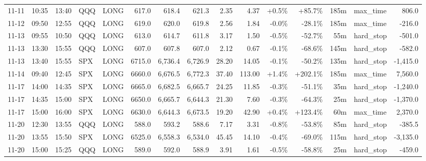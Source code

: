 \documentclass[11pt,a4paper,twoside]{article}
\begin{document}
\begin{landscape}
\begin{center}
\begin{longtable}{>{\color{txtmain}}l l l l l r r r r r r r r >{\color{txtmain}}l r}
11-11 & 10:35 & 13:40 & QQQ & LONG & 617.0 & 618.4 & 621.3 & 2.35 & 4.37 & \textcolor{wingreen}{+0.5\%} & \textcolor{wingreen}{+85.7\%} & 185m & max\_time & \textcolor{wingreen}{806.0} \\
11-12 & 09:50 & 12:55 & QQQ & LONG & 619.0 & 620.0 & 619.8 & 2.56 & 1.84 & \textcolor{lossred}{-0.0\%} & \textcolor{lossred}{-28.1\%} & 185m & max\_time & \textcolor{lossred}{-216.0} \\
11-13 & 09:55 & 10:50 & QQQ & LONG & 613.0 & 614.7 & 611.8 & 3.17 & 1.50 & \textcolor{lossred}{-0.5\%} & \textcolor{lossred}{-52.7\%} & 55m & hard\_stop & \textcolor{lossred}{-501.0} \\
11-13 & 13:30 & 15:55 & QQQ & LONG & 607.0 & 607.8 & 607.0 & 2.12 & 0.67 & \textcolor{lossred}{-0.1\%} & \textcolor{lossred}{-68.6\%} & 145m & hard\_stop & \textcolor{lossred}{-582.0} \\
11-13 & 13:40 & 15:55 & SPX & LONG & 6715.0 & 6,736.4 & 6,726.9 & 28.20 & 14.05 & \textcolor{lossred}{-0.1\%} & \textcolor{lossred}{-50.2\%} & 135m & hard\_stop & \textcolor{lossred}{-1,415.0} \\
11-14 & 09:40 & 12:45 & SPX & LONG & 6660.0 & 6,676.5 & 6,772.3 & 37.40 & 113.00 & \textcolor{wingreen}{+1.4\%} & \textcolor{wingreen}{+202.1\%} & 185m & max\_time & \textcolor{wingreen}{7,560.0} \\
11-17 & 14:00 & 14:35 & SPX & LONG & 6665.0 & 6,682.5 & 6,665.7 & 24.25 & 11.85 & \textcolor{lossred}{-0.3\%} & \textcolor{lossred}{-51.1\%} & 35m & hard\_stop & \textcolor{lossred}{-1,240.0} \\
11-17 & 14:35 & 15:00 & SPX & LONG & 6650.0 & 6,665.7 & 6,644.3 & 21.30 & 7.60 & \textcolor{lossred}{-0.3\%} & \textcolor{lossred}{-64.3\%} & 25m & hard\_stop & \textcolor{lossred}{-1,370.0} \\
11-17 & 15:00 & 16:00 & SPX & LONG & 6630.0 & 6,644.3 & 6,673.5 & 19.20 & 42.90 & \textcolor{wingreen}{+0.4\%} & \textcolor{wingreen}{+123.4\%} & 60m & max\_time & \textcolor{wingreen}{2,370.0} \\
11-20 & 12:30 & 13:55 & QQQ & LONG & 588.0 & 593.2 & 588.6 & 7.17 & 3.31 & \textcolor{lossred}{-0.8\%} & \textcolor{lossred}{-53.8\%} & 85m & hard\_stop & \textcolor{lossred}{-385.5} \\
11-20 & 13:55 & 15:50 & SPX & LONG & 6525.0 & 6,558.3 & 6,534.0 & 45.45 & 14.10 & \textcolor{lossred}{-0.4\%} & \textcolor{lossred}{-69.0\%} & 115m & hard\_stop & \textcolor{lossred}{-3,135.0} \\
11-20 & 15:00 & 15:25 & QQQ & LONG & 589.0 & 592.0 & 588.9 & 3.91 & 1.61 & \textcolor{lossred}{-0.5\%} & \textcolor{lossred}{-58.8\%} & 25m & hard\_stop & \textcolor{lossred}{-459.0} \\

\end{longtable}
\end{center}
\end{landscape}
\end{document}

